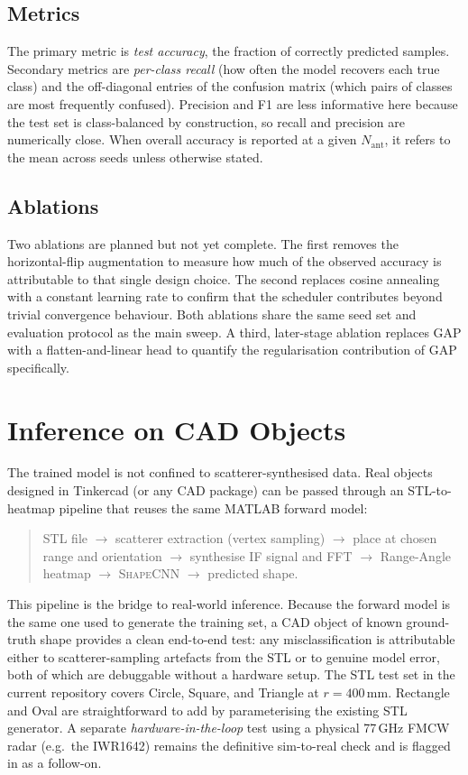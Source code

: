 \documentclass[letterpaper,11pt,leqno]{article}
\begin{document}
\subsection{Metrics}

The primary metric is \emph{test accuracy}, the fraction of correctly predicted samples. Secondary metrics are \emph{per-class recall} (how often the model recovers each true class) and the off-diagonal entries of the confusion matrix (which pairs of classes are most frequently confused). Precision and F1 are less informative here because the test set is class-balanced by construction, so recall and precision are numerically close. When overall accuracy is reported at a given $N_{\mathrm{ant}}$, it refers to the mean across seeds unless otherwise stated.

\subsection{Ablations}

Two ablations are planned but not yet complete. The first removes the horizontal-flip augmentation to measure how much of the observed accuracy is attributable to that single design choice. The second replaces cosine annealing with a constant learning rate to confirm that the scheduler contributes beyond trivial convergence behaviour. Both ablations share the same seed set and evaluation protocol as the main sweep. A third, later-stage ablation replaces GAP with a flatten-and-linear head to quantify the regularisation contribution of GAP specifically.

\section{Inference on CAD Objects}\label{s:cad}

The trained model is not confined to scatterer-synthesised data. Real objects designed in Tinkercad (or any CAD package) can be passed through an STL-to-heatmap pipeline that reuses the same MATLAB forward model:

\begin{quote}
STL file $\to$ scatterer extraction (vertex sampling) $\to$ place at chosen range and orientation $\to$ synthesise IF signal and FFT $\to$ Range-Angle heatmap $\to$ \textsc{ShapeCNN} $\to$ predicted shape.
\end{quote}

This pipeline is the bridge to real-world inference. Because the forward model is the same one used to generate the training set, a CAD object of known ground-truth shape provides a clean end-to-end test: any misclassification is attributable either to scatterer-sampling artefacts from the STL or to genuine model error, both of which are debuggable without a hardware setup. The STL test set in the current repository covers Circle, Square, and Triangle at $r=400$\,mm. Rectangle and Oval are straightforward to add by parameterising the existing STL generator. A separate \emph{hardware-in-the-loop} test using a physical 77\,GHz FMCW radar (e.g.\ the IWR1642) remains the definitive sim-to-real check and is flagged in  as a follow-on.
\end{document}
